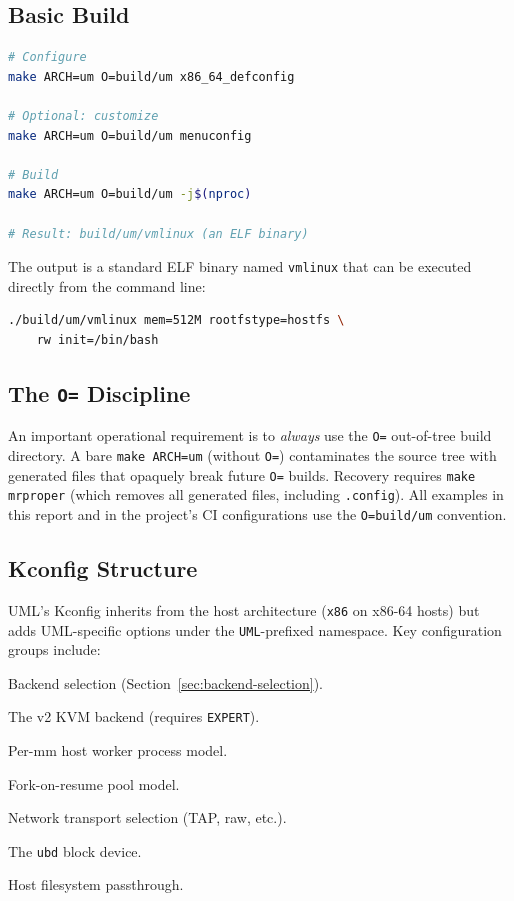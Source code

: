\subsection{Basic Build}

\begin{lstlisting}[language=bash, caption={Standard UML build commands.},
  label={lst:build}]
# Configure
make ARCH=um O=build/um x86_64_defconfig

# Optional: customize
make ARCH=um O=build/um menuconfig

# Build
make ARCH=um O=build/um -j$(nproc)

# Result: build/um/vmlinux (an ELF binary)
\end{lstlisting}

The output is a standard ELF binary named \texttt{vmlinux} that can be executed
directly from the command line:

\begin{lstlisting}[language=bash]
./build/um/vmlinux mem=512M rootfstype=hostfs \
    rw init=/bin/bash
\end{lstlisting}

\subsection{The \texttt{O=} Discipline}

An important operational requirement is to \emph{always} use the \texttt{O=}
out-of-tree build directory.  A bare \texttt{make ARCH=um} (without \texttt{O=})
contaminates the source tree with generated files that opaquely break future
\texttt{O=} builds.  Recovery requires \texttt{make mrproper} (which removes
all generated files, including \texttt{.config}).  All examples in this report
and in the project's CI configurations use the \texttt{O=build/um} convention.

\subsection{Kconfig Structure}

UML's Kconfig inherits from the host architecture (\texttt{x86} on x86-64
hosts) but adds UML-specific options under the \texttt{UML}-prefixed namespace.
Key configuration groups include:

\begin{description}[leftmargin=2em, style=nextline]
\item[\kconfig{UM\_BACKEND\_*}] Backend selection (Section~\ref{sec:backend-selection}).
\item[\kconfig{UM\_BACKEND\_KVM\_V2}] The v2 KVM backend (requires \texttt{EXPERT}).
\item[\kconfig{UM\_WORKER\_PROCESS}] Per-mm host worker process model.
\item[\kconfig{UM\_TEMPLATE\_PAUSE\_FORK}] Fork-on-resume pool model.
\item[\kconfig{UML\_NET\_*}] Network transport selection (TAP, raw, etc.).
\item[\kconfig{BLK\_DEV\_UBD}] The \texttt{ubd} block device.
\item[\kconfig{HOSTFS}] Host filesystem passthrough.
\end{description}


